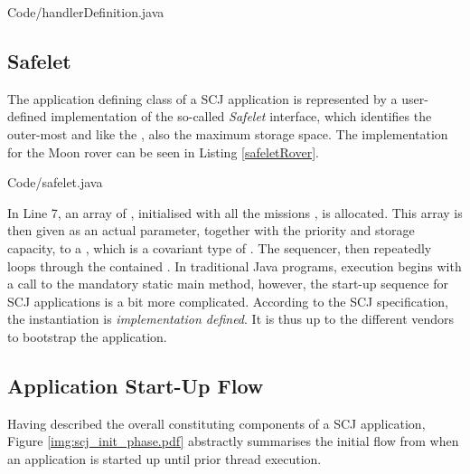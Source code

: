 
{Code/handlerDefinition.java}

\subsection{Safelet}
\label{subsection:safelet}
The application defining class of a SCJ application is represented by a user-defined implementation of the so-called \textit{Safelet} interface, which identifies the outer-most  and like the , also the maximum storage space. The  implementation for the Moon rover can be seen in Listing \ref{safeletRover}.


{Code/safelet.java}

In Line 7, an array of , initialised with all the missions , is allocated. This array is then given as an actual parameter, together with the priority and storage capacity, to a , which is a covariant type of . The sequencer, then repeatedly loops through the contained . In traditional Java programs, execution begins with a call to the mandatory static main method, however, the start-up sequence for SCJ applications is a bit more complicated. According to the SCJ specification, the  instantiation is \textit{implementation defined}. It is thus up to the different vendors to bootstrap the application.

\subsection{Application Start-Up Flow}
Having described the overall constituting components of a SCJ application, Figure \ref{img:scj_init_phase.pdf} abstractly summarises the initial flow from when an application is started up until prior thread execution.

